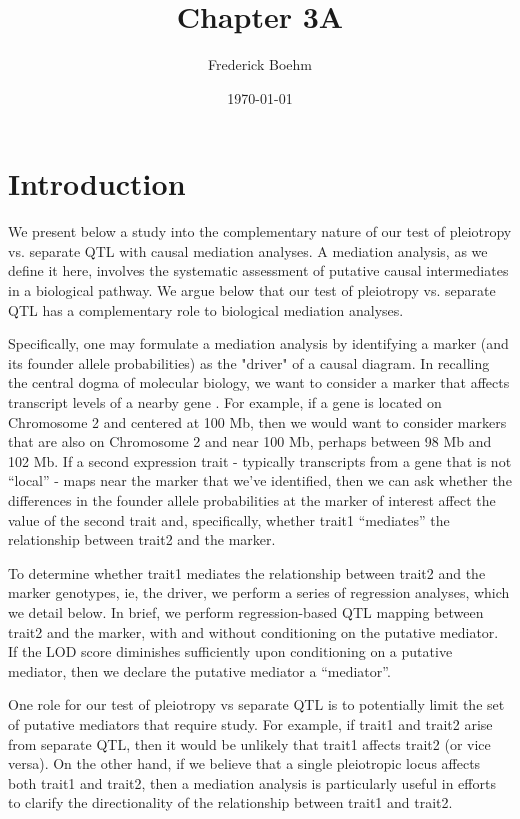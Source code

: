 \documentclass{article}
\title{Chapter 3A}
\author{Frederick Boehm}
\date{\today}
\begin{document}
\doublespacing
\maketitle
\listoftodos
\tableofcontents


\section{Introduction}


We present below a study into the complementary nature of our test of pleiotropy vs. separate QTL with causal mediation analyses. A mediation analysis, as we define it here, involves the systematic assessment of putative causal intermediates in a biological pathway. We argue below that our test of pleiotropy vs. separate QTL has a complementary role to biological mediation analyses. 

Specifically, one may formulate a mediation analysis by identifying a marker (and its founder allele probabilities) as the "driver" of a causal diagram. In recalling the central dogma of molecular biology, we want to consider a marker that affects transcript levels of a nearby gene \citep{crick1958protein}. For example, if a gene is located on Chromosome 2 and centered at 100 Mb, then we would want to consider markers that are also on Chromosome 2 and near 100 Mb, perhaps between 98 Mb and 102 Mb. If a second expression trait - typically transcripts from a gene that is not “local” - maps near the marker that we’ve identified, then we can ask whether the differences in the founder allele probabilities at the marker of interest affect the value of the second trait and, specifically, whether trait1 “mediates” the relationship between trait2 and the marker. 

To determine whether trait1 mediates the relationship between trait2 and the marker genotypes, ie, the driver, we perform a series of regression analyses, which we detail below. In brief, we perform regression-based QTL mapping between trait2 and the marker, with and without conditioning on the putative mediator. If the LOD score diminishes sufficiently upon conditioning on a putative mediator, then we declare the putative mediator a “mediator”. 

One role for our test of pleiotropy vs separate QTL is to potentially limit the set of putative mediators that require study. For example, if trait1 and trait2 arise from separate QTL, then it would be unlikely that trait1 affects trait2 (or vice versa). On the other hand, if we believe that a single pleiotropic locus affects both trait1 and trait2, then a mediation analysis is particularly useful in efforts to clarify the directionality of the relationship between trait1 and trait2.
\end{document}

